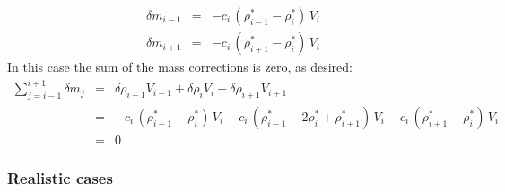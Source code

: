 \begin{eqnarray}
\delta m_{i-1} &=& - c_i \, (\rho_{i-1}^* - \rho_i^*) \, V_i \nonumber\\
\delta m_{i+1} &=& - c_i \, (\rho_{i+1}^* - \rho_i^*) \, V_i \nonumber
\end{eqnarray}
In this case the sum of the mass corrections is zero, as desired:
\begin{eqnarray}
\sum_{j=i-1}^{i+1} \delta m_j &=& \delta \rho_{i-1} V_{i-1} + \delta \rho_i V_i + \delta \rho_{i+1}V_{i+1} \nonumber\\
&=& - c_i \, (\rho_{i-1}^* - \rho_i^*) \, V_i + c_i \, (\rho_{i-1}^* - 2 \rho_i^* + \rho_{i+1}^*) \, V_i - c_i \, (\rho_{i+1}^* - \rho_i^*) \, V_i \nonumber\\
&=& 0 \nonumber
\end{eqnarray}

\subsubsection*{Realistic cases}


